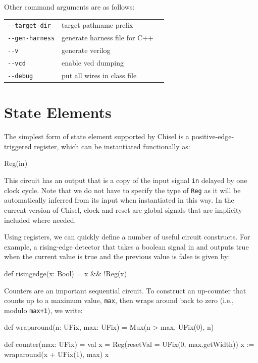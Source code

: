 \documentclass[twocolumn,10pt]{article}
\begin{document}
Other command arguments are as follows:
\begin{tabular}{lll}
\verb+--target-dir+ & target pathname prefix \\
\verb+--gen-harness+ & generate harness file for C++ \\
\verb+--v+ & generate verilog \\
\verb+--vcd+ & enable vcd dumping \\
\verb+--debug+ & put all wires in class file \\
\end{tabular}

\section{State Elements}
\label{sec:sequential}


The simplest form of state element supported by Chisel is a
positive-edge-triggered register, which can be instantiated
functionally as:
\begin{scala}
Reg(in)
\end{scala}

\noindent
This circuit has an output that is a copy of the input signal \verb+in+
delayed by one clock cycle.  Note that we do not have to specify the
type of \verb+Reg+ as it will be automatically inferred from its input
when instantiated in this way.  In the current version of Chisel,
clock and reset are global signals that are implicity included where
needed.

Using registers, we can quickly define a number of useful circuit
constructs.  For example, a rising-edge detector that takes a boolean
signal in and outputs true when the current value is true and the
previous value is false is given by:
\begin{scala}
def risingedge(x: Bool) = x && !Reg(x)
\end{scala}

Counters are an important sequential circuit.  To construct an
up-counter that counts up to a maximum value, \verb+max+, then wraps
around back to zero (i.e., modulo \verb!max+1!), we write:
\begin{scala}
def wraparound(n: UFix, max: UFix) =
  Mux(n > max, UFix(0), n)

def counter(max: UFix) = {
  val x = Reg(resetVal = UFix(0, max.getWidth))
  x := wraparound(x + UFix(1), max)
  x
}
\end{scala}
\end{document}
